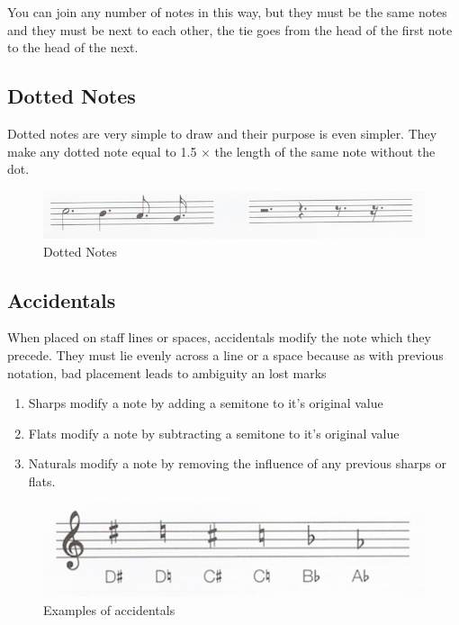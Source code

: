 You can join any number of notes in this way, but they must be the same notes and they must be next to each other, the tie goes from the head of the first note to the head of the next.

\subsection{Dotted Notes}

Dotted notes are very simple to draw and their purpose is even simpler. They make any dotted note equal to 1.5 $\times$ the length of the same note without the dot.

\begin{figure}[h!]
  \includegraphics[width=\linewidth]{gfx/basic/dotted-notes.png}
  \centering
  \caption{Dotted Notes}
  \label{fig:DottedNotes}
\end{figure}

\subsection{Accidentals}

When placed on staff lines or spaces, accidentals modify the note which they precede. They must lie evenly across a line or a space because as with previous notation, bad placement leads to ambiguity an lost marks

\begin{enumerate}
\item Sharps modify a note by adding a semitone to it's original value
\item Flats modify a note by subtracting a semitone to it's original value
\item Naturals modify a note by removing the influence of any previous sharps or flats.
\end{enumerate}

\begin{figure}[h!]
  \centering
  \includegraphics[width=\linewidth]{gfx/basic/accidentals.png}
  \caption{Examples of accidentals}
  \label{fig:Accidentals}
\end{figure}



